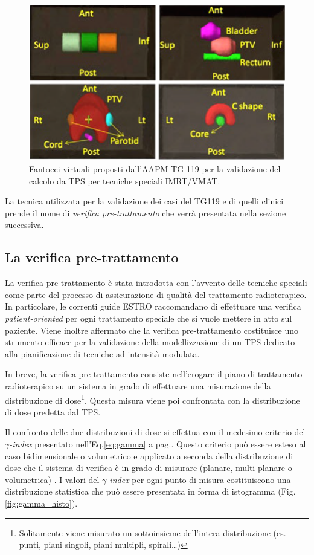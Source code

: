\begin{figure}
\centering
\includegraphics[width=.8\textwidth]{./cap2/TG119_phantoms}
\caption{Fantocci virtuali proposti dall'AAPM TG-119 \cite{Ezzell2009} per la validazione del calcolo da TPS per tecniche speciali IMRT/VMAT.}
\label{fig:TG119_phantoms}
\end{figure}

La tecnica utilizzata per la validazione dei casi del TG119 e di quelli clinici prende il nome di \textit{verifica pre-trattamento} che verrà presentata nella sezione successiva.

\subsection{La verifica pre-trattamento}
La verifica pre-trattamento è stata introdotta con l'avvento delle tecniche speciali come parte del processo di assicurazione di qualità del trattamento radioterapico. In particolare, le correnti guide ESTRO \cite{Mijnheer2005} raccomandano di effettuare una verifica \textit{patient-oriented} per ogni trattamento speciale che si vuole mettere in atto sul paziente. Viene inoltre affermato che la verifica pre-trattamento costituisce uno strumento efficace per la validazione della modellizzazione di un TPS dedicato alla pianificazione di tecniche ad intensità modulata.

In breve, la verifica pre-trattamento consiste nell'erogare il piano di trattamento radioterapico su un sistema in grado di effettuare una misurazione della distribuzione di dose\footnote{Solitamente viene misurato un sottoinsieme dell'intera distribuzione (es. punti, piani singoli, piani multipli, spirali\ldots)}. Questa misura viene poi confrontata con la distribuzione di dose predetta dal TPS.

Il confronto delle due distribuzioni di dose si effettua con il medesimo criterio del $\gamma$\textit{-index} presentato nell'Eq.\ref{eq:gamma} a pag.\pageref{eq:gamma}. Questo criterio può essere esteso al caso bidimensionale o volumetrico e applicato a seconda della distribuzione di dose che il sistema di verifica è in grado di misurare (planare, multi-planare o volumetrica) \cite{Low2011}. I valori del $\gamma$\textit{-index} per ogni punto di misura costituiscono una distribuzione statistica che può essere presentata in forma di istogramma (Fig.\ref{fig:gamma_histo}).

